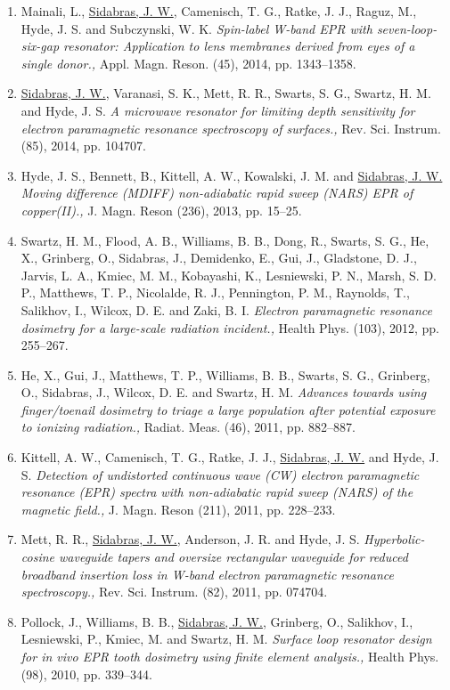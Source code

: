 \begin{enumerate}
    \item Mainali, L., \underline{Sidabras, J. W.}, Camenisch, T. G., Ratke, J. J., Raguz, M., Hyde, J. S. and Subczynski, W. K. \textit{Spin-label W-band EPR with seven-loop-six-gap resonator: Application to lens membranes derived from eyes of a single donor.,} Appl. Magn. Reson. (45), 2014, pp. 1343--1358.
    \item \underline{Sidabras, J. W.}, Varanasi, S. K., Mett, R. R., Swarts, S. G., Swartz, H. M. and Hyde, J. S. \textit{A microwave resonator for limiting depth sensitivity for electron paramagnetic resonance spectroscopy of surfaces.,} Rev. Sci. Instrum. (85), 2014, pp. 104707.
    \item Hyde, J. S., Bennett, B., Kittell, A. W., Kowalski, J. M. and \underline{Sidabras, J. W.} \textit{Moving difference (MDIFF) non-adiabatic rapid sweep (NARS) EPR of copper(II).,} J. Magn. Reson (236), 2013, pp. 15--25.
    \item Swartz, H. M., Flood, A. B., Williams, B. B., Dong, R., Swarts, S. G., He, X., Grinberg, O., Sidabras, J., Demidenko, E., Gui, J., Gladstone, D. J., Jarvis, L. A., Kmiec, M. M., Kobayashi, K., Lesniewski, P. N., Marsh, S. D. P., Matthews, T. P., Nicolalde, R. J., Pennington, P. M., Raynolds, T., Salikhov, I., Wilcox, D. E. and Zaki, B. I. \textit{Electron paramagnetic resonance dosimetry for a large-scale radiation incident.,} Health Phys. (103), 2012, pp. 255--267.
    \item He, X., Gui, J., Matthews, T. P., Williams, B. B., Swarts, S. G., Grinberg, O., Sidabras, J., Wilcox, D. E. and Swartz, H. M. \textit{Advances towards using finger/toenail dosimetry to triage a large population after potential exposure to ionizing radiation.,} Radiat. Meas. (46), 2011, pp. 882--887.
    \item Kittell, A. W., Camenisch, T. G., Ratke, J. J., \underline{Sidabras, J. W.} and Hyde, J. S. \textit{Detection of undistorted continuous wave (CW) electron paramagnetic resonance (EPR) spectra with non-adiabatic rapid sweep (NARS) of the magnetic field.,} J. Magn. Reson (211), 2011, pp. 228--233.
    \item Mett, R. R., \underline{Sidabras, J. W.}, Anderson, J. R. and Hyde, J. S. \textit{Hyperbolic-cosine waveguide tapers and oversize rectangular waveguide for reduced broadband insertion loss in W-band electron paramagnetic resonance spectroscopy.,} Rev. Sci. Instrum. (82), 2011, pp. 074704.
    \item Pollock, J., Williams, B. B., \underline{Sidabras, J. W.}, Grinberg, O., Salikhov, I., Lesniewski, P., Kmiec, M. and Swartz, H. M. \textit{Surface loop resonator design for in vivo EPR tooth dosimetry using finite element analysis.,} Health Phys. (98), 2010, pp. 339--344.

\end{enumerate}
